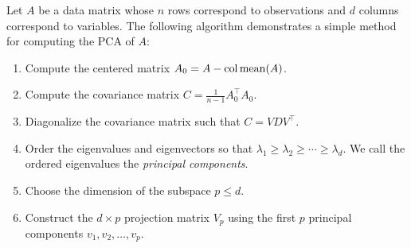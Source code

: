 Let \(A\) be a data matrix whose \(n\) rows correspond to observations and \(d\) columns correspond to variables.
The following algorithm demonstrates a simple method for computing the PCA of \(A\):
\begin{enumerate}
    \item Compute the centered matrix \(A_0 = A - \operatorname{col\,mean}(A)\).
    \item Compute the covariance matrix \(C = \frac{1}{n-1} A_0^\top A_0\).
    \item Diagonalize the covariance matrix such that \(C = V D V^\top\).
    \item Order the eigenvalues and eigenvectors so that \(\lambda_1 \geq \lambda_2 \geq \cdots \geq \lambda_d\).
    We call the ordered eigenvalues the \textit{principal components}.
    \item Choose the dimension of the subspace \(p \leq d\).
    \item Construct the \(d \times p\) projection matrix \(V_p\) using the first \(p\) principal components \(v_1, v_2, \dots, v_p\).
\end{enumerate}






